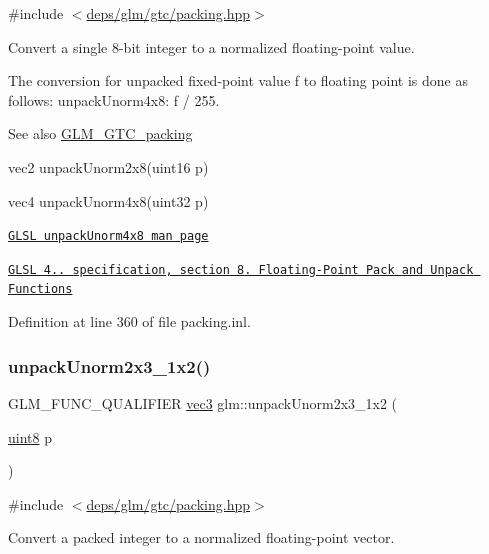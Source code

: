 {\ttfamily \#include $<$\hyperlink{gtc_2packing_8hpp}{deps/glm/gtc/packing.\+hpp}$>$}

Convert a single 8-\/bit integer to a normalized floating-\/point value.

The conversion for unpacked fixed-\/point value f to floating point is done as follows\+: unpack\+Unorm4x8\+: f / 255.

\begin{DoxySeeAlso}{See also}
\hyperlink{group__gtc__packing}{G\+L\+M\+\_\+\+G\+T\+C\+\_\+packing} 

vec2 unpack\+Unorm2x8(uint16 p) 

vec4 unpack\+Unorm4x8(uint32 p) 

\href{http://www.opengl.org/sdk/docs/manglsl/xhtml/unpackUnorm4x8.xml}{\tt G\+L\+SL unpack\+Unorm4x8 man page} 

\href{http://www.opengl.org/registry/doc/GLSLangSpec.4.20.8.pdf}{\tt G\+L\+SL 4.. specification, section 8. Floating-\/\+Point Pack and Unpack Functions} 
\end{DoxySeeAlso}


Definition at line 360 of file packing.\+inl.

\mbox{\label{group__gtc__packing_gaeeacc5275329100c50fe8fc0871eb423}} 
\subsubsection{\texorpdfstring{unpack\+Unorm2x3\+\_\+1x2()}{unpackUnorm2x3\_1x2()}}
{\footnotesize\ttfamily G\+L\+M\+\_\+\+F\+U\+N\+C\+\_\+\+Q\+U\+A\+L\+I\+F\+I\+ER \hyperlink{group__core__types_ga1c47e8b3386109bc992b6c48e91b0be7}{vec3} glm\+::unpack\+Unorm2x3\+\_\+1x2 (\begin{DoxyParamCaption}\item[{\hyperlink{group__gtc__type__precision_ga1a7dcd8aac97cc8020817c94049deff2}{uint8}}]{p }\end{DoxyParamCaption})}



{\ttfamily \#include $<$\hyperlink{gtc_2packing_8hpp}{deps/glm/gtc/packing.\+hpp}$>$}

Convert a packed integer to a normalized floating-\/point vector.

